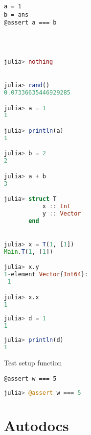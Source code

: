 \label{12217055824246208395}{}



\begin{lstlisting}[]
a = 1
b = ans
@assert a === b
\end{lstlisting}




\begin{lstlisting}[language=julia, style=jlcodestyle]



julia> nothing


julia> rand()
0.07336635446929285

julia> a = 1
1

julia> println(a)
1

julia> b = 2
2

julia> a + b
3

julia> struct T
           x :: Int
           y :: Vector
       end


julia> x = T(1, [1])
Main.T(1, [1])

julia> x.y
1-element Vector{Int64}:
 1

julia> x.x
1
\end{lstlisting}




\begin{lstlisting}[language=julia, style=jlcodestyle]
julia> d = 1
1
\end{lstlisting}




\begin{lstlisting}[language=julia, style=jlcodestyle]
julia> println(d)
1
\end{lstlisting}



Test setup function






\begin{lstlisting}[]
@assert w === 5
\end{lstlisting}




\begin{lstlisting}[language=julia, style=jlcodestyle]
julia> @assert w === 5

\end{lstlisting}



\chapter{Autodocs}



